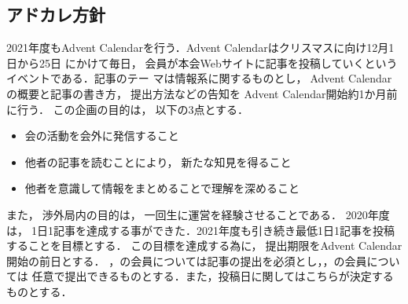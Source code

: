 \subsection*{アドカレ方針}


2021年度もAdvent Calendarを行う．Advent Calendarはクリスマスに向け12月1日から25日
にかけて毎日，会員が本会Webサイトに記事を投稿していくというイベントである．記事のテー
マは情報系に関するものとし，Advent Calendarの概要と記事の書き方，提出方法などの告知を
Advent Calendar開始約1か月前に行う．
この企画の目的は，以下の3点とする．
\begin{itemize}
    \item 会の活動を会外に発信すること
    \item 他者の記事を読むことにより，新たな知見を得ること
    \item 他者を意識して情報をまとめることで理解を深めること
\end{itemize}

また，渉外局内の目的は，一回生に運営を経験させることである．
2020年度は，1日1記事を達成する事ができた．2021年度も引き続き最低1日1記事を投稿することを目標とする．
この目標を達成する為に，提出期限をAdvent Calendar開始の前日とする．
\firstGrade{}，\secondGrade{}の会員については記事の提出を必須とし，\thirdGrade{}，\fourthGrade{}の会員については
任意で提出できるものとする．また，投稿日に関してはこちらが決定するものとする．
